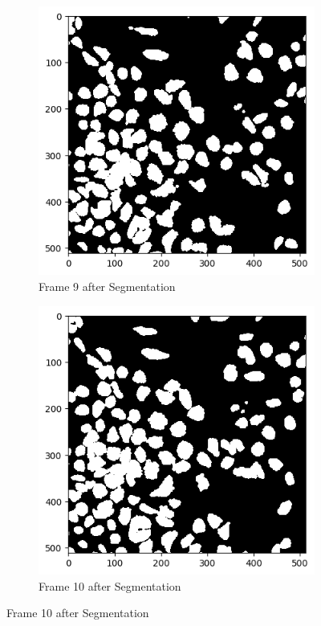 \documentclass{article}
\begin{document}
\begin{figure}[h!]
  \begin{subfigure}{0.4\textwidth}
    \includegraphics[width=\linewidth]{Report/Appendix_Images/Segmentation-A-Control/frame_9.png}
    \caption*{Frame 9 after Segmentation}
  \end{subfigure}
  \hfill
  \begin{subfigure}{0.4\textwidth}
    \includegraphics[width=\linewidth]{Report/Appendix_Images/Segmentation-A-Control/frame_10.png}
    \caption*{Frame 10 after Segmentation}
  \end{subfigure}


\end{figure}
\end{document}
